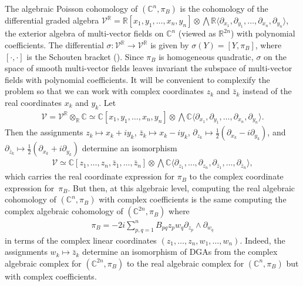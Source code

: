 \documentclass[pdftex]{sigma}
\numberwithin{equation}{section}
\begin{document}
The algebraic Poisson cohomology of $({\mathbb C}^n,\pi_B)$ is the cohomology of the dif\/ferential graded algebra $\mathcal V^{\mathbb R}={\mathbb R}[x_1,y_1,\dots,x_n,y_n]\otimes \bigwedge {\mathbb R}\langle \partial_{x_1},\partial_{y_1},\dots,\partial_{x_n},\partial_{y_n}\rangle$, the exterior algebra of multi-vector f\/ields on ${\mathbb C}^n$ (viewed as ${\mathbb R}^{2n}$) with polynomial coef\/f\/icients. The dif\/ferential $\sigma\colon \mathcal V^{\mathbb R}\to\mathcal V^{\mathbb R}$ is given by $\sigma(Y)=[Y,\pi_B]$, where $[\cdot,\cdot]$ is the Schouten bracket (\cite{Vaisman}). Since $\pi_B$ is homogeneous quadratic, $\sigma$ on the space of smooth multi-vector f\/ields leaves invariant the subspace of multi-vector f\/ields with polynomial coef\/f\/icients. It will be convenient to complexify the problem so that we can work with complex coordinates $z_k$ and $\bar{z}_k$ instead of the real coordinates $x_k$ and $y_k$. Let
\begin{gather*}
\mathcal V=\mathcal V^{\mathbb R}\otimes_{\mathbb R}{\mathbb C} \simeq {\mathbb C}[x_1,y_1,\dots,x_n,y_n]\otimes \bigwedge {\mathbb C}\langle \partial_{x_1},\partial_{y_1},\dots,\partial_{x_n},\partial_{y_n}\rangle.
\end{gather*}
Then the assignments $z_k\mapsto x_k+iy_k$, $\bar{z}_k\mapsto x_k-iy_k$, $\partial_{z_k}\mapsto \frac{1}{2}(\partial_{x_k}-i\partial_{y_k})$, and $\partial_{\bar{z}_k}\mapsto \frac{1}{2}(\partial_{x_k}+i\partial_{y_k})$ determine an isomorphism
\begin{gather*}
\mathcal V\simeq {\mathbb C}[z_1,\dots,z_n,\bar{z}_1,\dots,\bar{z}_n]\otimes \bigwedge {\mathbb C}\langle \partial_{z_1},\dots,\partial_{z_n},\partial_{\bar{z}_1},\dots,\partial_{\bar{z}_n}\rangle,
\end{gather*}
which carries the real coordinate expression for $\pi_B$ to the complex coordinate expression for~$\pi_B$. But then, at this algebraic level, computing the real algebraic cohomology of $({\mathbb C}^n,\pi_B)$ with complex coef\/f\/icients is the same computing the complex algebraic cohomology of $({\mathbb C}^{2n},\pi_B)$ where
\begin{gather}\label{general_pi_z_w_with_factor}
\pi_B=-2i\sum_{p,q=1}^n B_{pq} z_pw_q\partial_{z_p}\wedge\partial_{w_q}
\end{gather}
in terms of the complex linear coordinates $(z_1,\dots,z_n,w_1,\dots,w_n)$. Indeed, the assignments $w_k\mapsto \bar{z}_k$ determine an isomorphism of DGAs from the complex algebraic complex for $({\mathbb C}^{2n},\pi_B)$ to the real algebraic complex for $({\mathbb C}^n,\pi_B)$ but with complex coef\/f\/icients.
\end{document}
